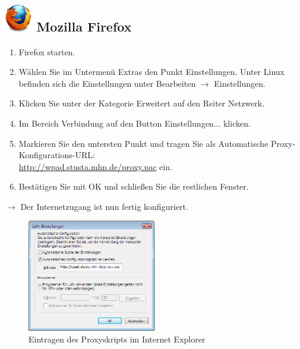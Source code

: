 \documentclass[a4paper,12pt,draft]{scrartcl}
\begin{document}
\subsection*{\includegraphics[height=1.2cm,keepaspectratio]{Bilder/Firefox_35_logo} Mozilla Firefox}
\begin{enumerate}
    \item Firefox starten.
    \item Wählen Sie im Untermenü Extras den Punkt Einstellungen. Unter Linux befinden sich die Einstellungen unter Bearbeiten $\rightarrow$ Einstellungen.
    \item Klicken Sie unter der Kategorie Erweitert auf den Reiter Netzwerk.
    \item Im Bereich Verbindung auf den Button Einstellungen... klicken.
    \item Markieren Sie den untersten Punkt und tragen Sie als Automatische Proxy-Konfigurations-URL: \\ \url{http://wpad.stusta.mhn.de/proxy.pac} ein.
    \item Bestätigen Sie mit OK und schließen Sie die restlichen Fenster.
\end{enumerate}
$\rightarrow$ Der Internetzugang ist nun fertig konfiguriert.


\begin{figure}
  \begin{center}
    \includegraphics[width=0.5\textwidth,keepaspectratio]{Bilder/Proxy_IE}
  \end{center}
  \caption{Eintragen des Proxyskripts im Internet Explorer}
\end{figure}
\end{document}
